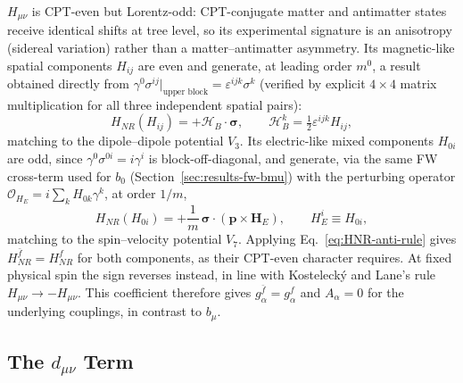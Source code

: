 $H_{\mu\nu}$ is CPT-even but Lorentz-odd: CPT-conjugate matter and
antimatter states receive identical shifts at tree level, so its
experimental signature is an anisotropy (sidereal variation) rather than a
matter--antimatter asymmetry. Its
magnetic-like spatial components $H_{ij}$ are even and generate, at leading
order $m^0$, a result obtained directly from
$\gamma^0\sigma^{ij}\big|_{\text{upper block}}=\varepsilon^{ijk}\sigma^k$
(verified by explicit $4\times4$ matrix multiplication for all three
independent spatial pairs):
\begin{equation}
  H_{NR}(H_{ij}) = +\boldsymbol{\mathcal H}_B\cdot\boldsymbol\sigma,
  \qquad \mathcal H_B^k=\tfrac12\varepsilon^{ijk}H_{ij},
\end{equation}
matching to the dipole--dipole potential $V_3$. Its electric-like mixed
components $H_{0i}$ are odd, since $\gamma^0\sigma^{0i}=i\gamma^i$ is
block-off-diagonal, and generate, via the same FW cross-term used for
$b_0$ (Section~\ref{sec:results-fw-bmu}) with the perturbing operator
$\mathcal O_{H_E}=i\sum_k H_{0k}\gamma^k$, at order $1/m$,
\begin{equation}
  H_{NR}(H_{0i}) = +\frac1m\,\boldsymbol\sigma\cdot(\mathbf p\times\mathbf H_E),
  \qquad H_E^i\equiv H_{0i},
\end{equation}
matching to the spin--velocity potential $V_7$. Applying
Eq.~\eqref{eq:HNR-anti-rule} gives $H_{NR}^{\bar f}=H_{NR}^f$ for both
components, as their CPT-even character requires. At fixed physical spin
the sign reverses instead, in line with Kostelecký and Lane's rule
$H_{\mu\nu}\to-H_{\mu\nu}$. This coefficient therefore gives
$g^{\bar f}_\alpha=g^f_\alpha$ and $A_\alpha=0$ for the underlying
couplings, in contrast to $b_\mu$.

\subsection{The \texorpdfstring{$d_{\mu\nu}$}{d\_mu\_nu} Term}


